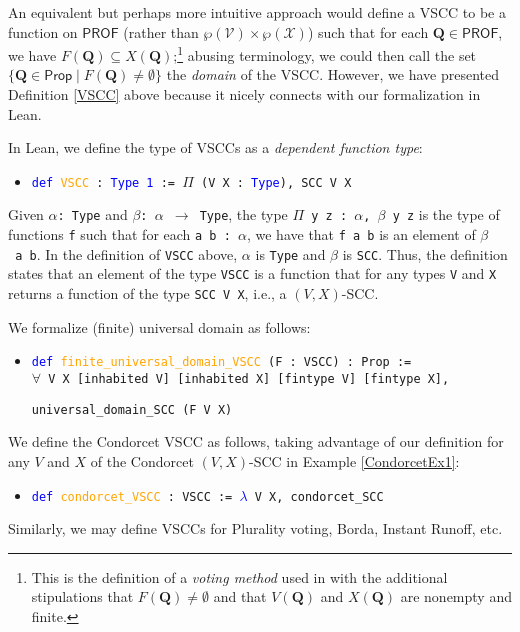 \documentclass[runningheads]{llncs}
\begin{document}
\noindent An equivalent but perhaps more intuitive approach would define a VSCC to be a function on $\mathsf{PROF}$ (rather than $\wp(\mathcal{V})\times\wp(\mathcal{X})$) such that for each $\mathbf{Q}\in\mathsf{PROF}$, we have $F(\mathbf{Q})\subseteq X(\mathbf{Q})$;\footnote{This is the definition of a \textit{voting method} used in \cite{HP2020b} with the additional stipulations that $F(\mathbf{Q})\neq\emptyset$ and  that $V(\mathbf{Q})$ and $X(\mathbf{Q})$ are nonempty and finite.} abusing terminology, we could then call the set $\{\mathbf{Q}\in\mathsf{Prop}\mid F(\mathbf{Q})\neq\emptyset\}$ the \emph{domain} of the VSCC. However, we have presented Definition \ref{VSCC} above because it nicely connects with our formalization in Lean.



In Lean, we define the type of VSCCs as a \textit{dependent function type}:
\begin{itemize}
\item[] \texttt{\textcolor{blue}{def} \textcolor{orange}{VSCC} : \textcolor{blue}{Type 1} := $\Pi$ (V X : \textcolor{blue}{Type}), SCC V X}
\end{itemize}
Given \texttt{$\alpha$: Type} and \texttt{$\beta$: $\alpha$ $\to$ Type}, the type \texttt{$\Pi$ y z : $\alpha$, $\beta$ y z} is the type of functions \texttt{f} such that for each \texttt{a b : $\alpha$}, we have that \texttt{f a b} is an element of \texttt{$\beta$~a~b}. In the definition of \texttt{VSCC} above, $\alpha$ is \texttt{Type} and $\beta$ is \texttt{SCC}.  Thus, the definition states that an element of the type \texttt{VSCC} is a function that for any types \texttt{V} and \texttt{X} returns a function of the type \texttt{SCC V X}, i.e., a $(V,X)$-SCC. 

We formalize (finite) universal domain as follows:
\begin{itemize}
\item[] \texttt{\textcolor{blue}{def} \textcolor{orange}{finite\_universal\_domain\_VSCC} (F : VSCC) : Prop :=}\\
    \texttt{$\forall$ V X [inhabited V] [inhabited X] [fintype V] [fintype X],}
    
    \texttt{universal\_domain\_SCC (F V X)}
\end{itemize}

\begin{example} We define the Condorcet VSCC as follows, taking advantage of our definition for any $V$ and $X$ of the Condorcet $(V,X)$-SCC in Example \ref{CondorcetEx1}:
\begin{itemize}
\item[] \texttt{\textcolor{blue}{def} \textcolor{orange}{condorcet\_VSCC} : VSCC := \textcolor{blue}{$\lambda$} V X, condorcet\_SCC}
\end{itemize}
\end{example}
Similarly, we may define VSCCs for Plurality voting, Borda, Instant Runoff, etc. 
\end{document}
